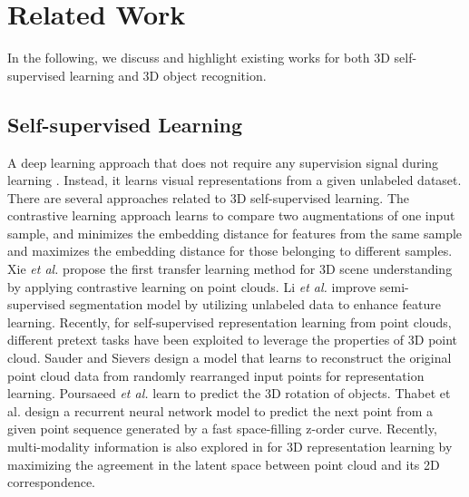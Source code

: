 \documentclass{article}
\begin{document}
\section{Related Work}

\label{sec:related}

In the following, we  discuss and highlight existing works for both 3D self-supervised learning and 3D object recognition.

\subsection{Self-supervised Learning}
A deep learning approach that does not require any supervision signal during learning \cite{caron2020unsupervised,DBLP:journals/corr/abs-1911-05722,caron2018deep,DBLP:journals/corr/DoerschGE15,DBLP:journals/corr/abs-1805-00385,DBLP:journals/corr/ZhangIE16,larsson2017colorization,jenni2018selfsupervised,noroozi2017representation,chen2020mocov2,asano2020self,gidaris2018unsupervised,ji2019invariant}. 
Instead, it learns visual representations from a given unlabeled dataset. There are several approaches related to 3D self-supervised learning. The contrastive learning approach learns to compare two augmentations of one input sample, and minimizes the embedding distance for features from the same sample and maximizes the embedding distance for those belonging to different samples. Xie \textit{et al.} \cite{https://doi.org/10.48550/arxiv.2007.10985} propose the first transfer learning method for 3D scene understanding by applying contrastive learning on point clouds. Li \textit{et al.} \cite{https://doi.org/10.48550/arxiv.2110.08188} improve semi-supervised segmentation model by utilizing unlabeled data to enhance feature learning. Recently, for self-supervised representation learning from point clouds, different pretext tasks have been exploited to leverage the properties of 3D point cloud. Sauder and Sievers \cite{https://doi.org/10.48550/arxiv.1901.08396} design a model that learns to reconstruct the original point cloud data from randomly rearranged input points for representation learning. Poursaeed \textit{et al. }\cite{poursaeed2020selfsupervised} learn to predict the 3D rotation of objects. Thabet et al. \cite{thabet2019mortonnet} design a recurrent neural network model to predict the next point from a given point sequence generated by a fast space-filling z-order curve. Recently, multi-modality information is also explored in  \cite{https://doi.org/10.48550/arxiv.2203.00680} for 3D representation learning by maximizing the agreement in the latent space between point cloud and its 2D correspondence.
\end{document}
